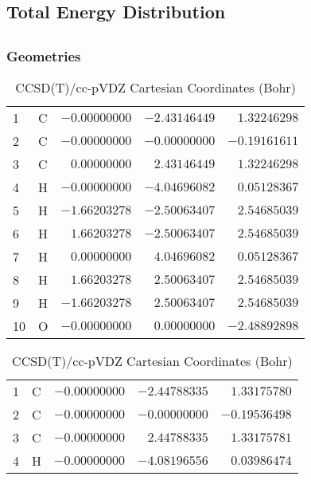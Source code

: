 \documentclass[10pt,oneside]{article}
\begin{document}
\begin{table}
\subsection*{Total Energy Distribution}
\centering\end{table}

\clearpage

\subsection{}

\begin{table}[h!]
\subsubsection*{Geometries}
\begin{multicols}{2}
\centering
\caption{CCSD(T)/cc-pVTZ Cartesian Coordinates (Bohr)}
\begin{tabular}{llrrr}
\toprule
1  & C  & $-0.00000000$ & $-2.43146449$ & $ 1.32246298$ \\
2  & C  & $-0.00000000$ & $-0.00000000$ & $-0.19161611$ \\
3  & C  & $ 0.00000000$ & $ 2.43146449$ & $ 1.32246298$ \\
4  & H  & $-0.00000000$ & $-4.04696082$ & $ 0.05128367$ \\
5  & H  & $-1.66203278$ & $-2.50063407$ & $ 2.54685039$ \\
6  & H  & $ 1.66203278$ & $-2.50063407$ & $ 2.54685039$ \\
7  & H  & $ 0.00000000$ & $ 4.04696082$ & $ 0.05128367$ \\
8  & H  & $ 1.66203278$ & $ 2.50063407$ & $ 2.54685039$ \\
9  & H  & $-1.66203278$ & $ 2.50063407$ & $ 2.54685039$ \\
10 & O  & $-0.00000000$ & $ 0.00000000$ & $-2.48892898$ \\
\bottomrule
\end{tabular}
\caption{CCSD(T)/cc-pVDZ Cartesian Coordinates (Bohr)}
\begin{tabular}{llrrr}
\toprule
1  & C  & $-0.00000000$ & $-2.44788335$ & $ 1.33175780$ \\
2  & C  & $-0.00000000$ & $-0.00000000$ & $-0.19536498$ \\
3  & C  & $-0.00000000$ & $ 2.44788335$ & $ 1.33175781$ \\
4  & H  & $-0.00000000$ & $-4.08196556$ & $ 0.03986474$ \\

\end{tabular}
\end{multicols}
\end{table}
\end{document}
